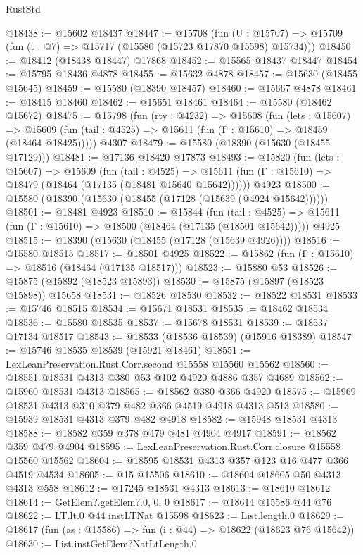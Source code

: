 \begin{lexlean}{RustStd}
\begin{coremodule}
@18438 := @15602 @18437
@18447 := @15708
    (fun (U : @15707) => @15709 (fun (t : @7) => @15717 (@15580 (@15723 @17870 @15598) @15734)))
@18450 := @18412 (@18438 @18447) @17868
@18452 := @15565 @18437 @18447
@18454 := @15795 @18436 @4878
@18455 := @15632 @4878
@18457 := @15630 (@18455 @15645)
@18459 := @15580 (@18390 @18457)
@18460 := @15667 @4878
@18461 := @18415 @18460
@18462 := @15651 @18461
@18464 := @15580 (@18462 @15672)
@18475 := @15798
    (fun (rty : @4232) =>
    @15608
      (fun (lets : @15607) =>
      @15609 (fun (tail : @4525) => @15611 (fun (Γ : @15610) => @18459 (@18464 @18425)))))
    @4307
@18479 := @15580 (@18390 (@15630 (@18455 @17129)))
@18481 := @17136 @18420 @17873
@18493 := @15820
    (fun (lets : @15607) =>
    @15609
      (fun (tail : @4525) =>
      @15611 (fun (Γ : @15610) => @18479 (@18464 (@17135 (@18481 @15640 @15642))))))
    @4923
@18500 := @15580 (@18390 (@15630 (@18455 (@17128 (@15639 (@4924 @15642))))))
@18501 := @18481 @4923
@18510 := @15844
    (fun (tail : @4525) => @15611 (fun (Γ : @15610) => @18500 (@18464 (@17135 (@18501 @15642)))))
    @4925
@18515 := @18390 (@15630 (@18455 (@17128 (@15639 @4926))))
@18516 := @15580 @18515
@18517 := @18501 @4925
@18522 := @15862 (fun (Γ : @15610) => @18516 (@18464 (@17135 @18517)))
@18523 := @15880 @53
@18526 := @15875 (@15892 (@18523 @15893))
@18530 := @15875 (@15897 (@18523 @15898)) @15658
@18531 := @18526 @18530
@18532 := @18522 @18531
@18533 := @15746 @18515
@18534 := @15671 @18531
@18535 := @18462 @18534
@18536 := @15580 @18535
@18537 := @15678 @18531
@18539 := @18537 @17134 @18517
@18543 := @18533 (@18536 @18539) (@15916 @18389)
@18547 := @15746 @18535 @18539 (@15921 @18461)
@18551 := LexLeanPreservation.Rust.Corr.second @15558 @15560 @15562
@18560 := @18551 @18531 @4313 @380 @53 @102 @4920 @4886 @357 @4689
@18562 := @15960 @18531 @4313
@18565 := @18562 @380 @366 @4920
@18575 := @15969 @18531 @4313 @310 @379 @482 @366 @4519 @4918 @4313 @513
@18580 := @15939 @18531 @4313 @379 @482 @4918
@18582 := @15948 @18531 @4313
@18588 := @18582 @359 @378 @479 @481 @4904 @4917
@18591 := @18562 @359 @479 @4904
@18595 := LexLeanPreservation.Rust.Corr.closure @15558 @15560 @15562
@18604 := @18595 @18531 @4313 @357 @123 @16 @477 @366 @4519 @4534
@18605 := @15 @15506
@18610 := @18604 @18605 @50 @4313 @4313 @558
@18612 := @17245 @18531 @4313
@18613 := @18610 @18612
@18614 := GetElem?.getElem?.{0, 0, 0}
@18617 := @18614 @15586 @44 @76
@18622 := LT.lt.{0} @44 instLTNat @15598
@18623 := List.length.{0}
@18629 := @18617 (fun (as : @15586) => fun (i : @44) => @18622 (@18623 @76 @15642))
@18630 := List.instGetElem?NatLtLength.{0}

\end{coremodule}
\end{lexlean}
